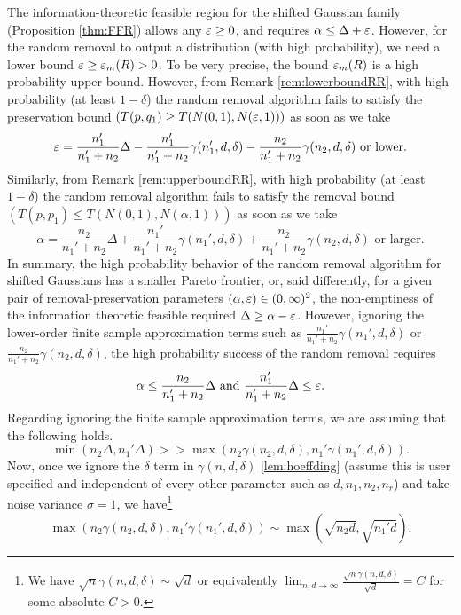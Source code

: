 \begin{remark} \label{rem:ICGRR}
    The information-theoretic feasible region for the shifted Gaussian family (Proposition \ref{thm:FFR}) allows any $\varepsilon \geq 0$, and requires $\alpha \leq \Delta + \varepsilon$. However, for the random removal to output a distribution (with high probability), we need a lower bound $\varepsilon \geq \varepsilon_m(R) >0$. To be very precise, the bound $\varepsilon_m(R)$ is a high probability upper bound. However, from Remark \ref{rem:lowerboundRR}, with high probability (at least $1-\delta$) the random removal algorithm fails to satisfy the preservation bound $(T(p,q_1)\geq T(N(0,1), N(\varepsilon,1)))$ as soon as we take \[
    \varepsilon= \frac{n_1'}{n_1' + n_2}  \Delta - \frac{n_1'}{n_1' + n_2}  \gamma(n_1',d,\delta) - \frac{n_2}{n_1' + n_2}  \gamma(n_2, d,\delta) 
    \text { or lower}.
    \]
    Similarly, from Remark \ref{rem:upperboundRR}, with high probability (at least $1-\delta$) the random removal algorithm fails to satisfy the removal bound $(T(p,p_1)\leq T(N(0,1), N(\alpha,1)))$ as soon as we take \[
    \alpha = \frac{n_2}{n_1' + n_2}  \Delta + \frac{n_1'}{n_1' + n_2}  \gamma(n_1',d,\delta) + \frac{n_2}{n_1' + n_2}  \gamma(n_2, d,\delta) 
    \text { or larger}.
    \]
    In summary, the high probability behavior of the random removal algorithm for shifted Gaussians has a smaller Pareto frontier, or, said differently, for a given pair of removal-preservation parameters $(\alpha, \varepsilon) \in (0,\infty)^2$, the non-emptiness of the information theoretic feasible required $\Delta \geq \alpha- \varepsilon$. However, ignoring the lower-order finite sample approximation terms such as $\frac{n_1'}{n_1' + n_2}  \gamma(n_1',d,\delta)$ or  $\frac{n_2}{n_1' + n_2}  \gamma(n_2, d,\delta)$, the high probability success of the random removal requires 
    \[
    \alpha \leq \frac{n_2}{n_1'+n_2} \Delta 
    \text{ and }
    \frac{n_1'}{n_1'+n_2}\Delta 
    \leq 
    \varepsilon.
    \]
    Regarding ignoring the finite sample approximation terms, we are assuming that the following holds.
    \[
    \min(n_2\Delta, n_1'\Delta) >> \max(n_2 \gamma(n_2,d,\delta), n_1'\gamma(n_1',d,\delta)).
    \]
   Now, once we ignore the $\delta$ term in $\gamma(n, d, \delta)$ \ref{lem:hoeffding} (assume this is user specified and independent of every other parameter such as $d,n_1,n_2,n_r$) and take noise variance $\sigma=1$, we have\footnote{We have $ \sqrt{n}\gamma(n,d,\delta) \sim \sqrt{d}$ or equivalently $\lim_{n,d \to  \infty} \frac{\sqrt{n}\gamma(n,d,\delta)}{\sqrt{d}}= C$ for some absolute $C>0$.}
   \[
   \max(n_2 \gamma(n_2,d,\delta), n_1'\gamma(n_1',d,\delta)) \sim \max( \sqrt{n_2d}, \sqrt{n_1'd}).
\]
\end{remark}

